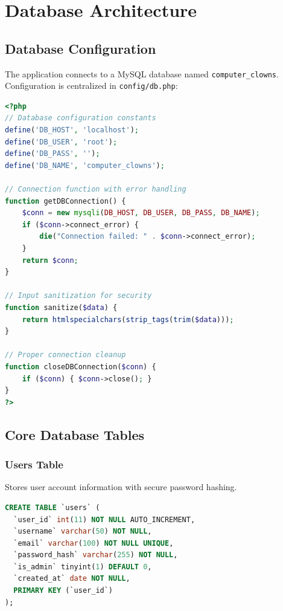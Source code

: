 \documentclass[12pt,a4paper]{article}
\begin{document}
\section{Database Architecture}

\subsection{Database Configuration}

The application connects to a MySQL database named \texttt{computer\_clowns}. Configuration is centralized in \texttt{config/db.php}:

\begin{lstlisting}[language=PHP, caption=Database Configuration (db.php)]
<?php
// Database configuration constants
define('DB_HOST', 'localhost');
define('DB_USER', 'root');
define('DB_PASS', '');
define('DB_NAME', 'computer_clowns');

// Connection function with error handling
function getDBConnection() {
    $conn = new mysqli(DB_HOST, DB_USER, DB_PASS, DB_NAME);
    if ($conn->connect_error) {
        die("Connection failed: " . $conn->connect_error);
    }
    return $conn;
}

// Input sanitization for security
function sanitize($data) {
    return htmlspecialchars(strip_tags(trim($data)));
}

// Proper connection cleanup
function closeDBConnection($conn) {
    if ($conn) { $conn->close(); }
}
?>
\end{lstlisting}

\subsection{Core Database Tables}

\subsubsection{Users Table}
Stores user account information with secure password hashing.

\begin{lstlisting}[language=SQL, caption=Users Table Schema]
CREATE TABLE `users` (
  `user_id` int(11) NOT NULL AUTO_INCREMENT,
  `username` varchar(50) NOT NULL,
  `email` varchar(100) NOT NULL UNIQUE,
  `password_hash` varchar(255) NOT NULL,
  `is_admin` tinyint(1) DEFAULT 0,
  `created_at` date NOT NULL,
  PRIMARY KEY (`user_id`)
);
\end{lstlisting}
\end{document}
